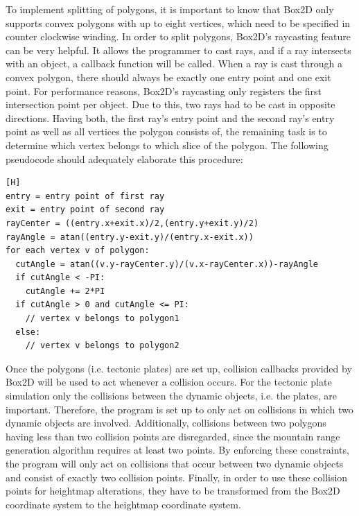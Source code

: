 \documentclass[11pt,a4paper,twoside,openright]{report}
\begin{document}
To implement splitting of polygons, it is important to know that Box2D only supports convex polygons with up to eight vertices, which need to be specified in counter clockwise winding. In order to split polygons, Box2D's raycasting feature can be very helpful. It allows the programmer to cast rays, and if a ray intersects with an object, a callback function will be called. When a ray is cast through a convex polygon, there should always be exactly one entry point and one exit point. For performance reasons, Box2D's raycasting only registers the first intersection point per object. Due to this, two rays had to be cast in opposite directions. Having both, the first ray's entry point and the second ray's entry point as well as all vertices the polygon consists of, the remaining task is to determine which vertex belongs to which slice of the polygon. The following pseudocode should adequately elaborate this procedure:

\begin{lstlisting}[caption=Point in slice check pseudocode][H]
entry = entry point of first ray
exit = entry point of second ray
rayCenter = ((entry.x+exit.x)/2,(entry.y+exit.y)/2)
rayAngle = atan((entry.y-exit.y)/(entry.x-exit.x))
for each vertex v of polygon:
  cutAngle = atan((v.y-rayCenter.y)/(v.x-rayCenter.x))-rayAngle
  if cutAngle < -PI:
    cutAngle += 2*PI
  if cutAngle > 0 and cutAngle <= PI:
    // vertex v belongs to polygon1
  else:
    // vertex v belongs to polygon2
\end{lstlisting}

\noindent Once the polygons (i.e. tectonic plates) are set up, collision callbacks provided by Box2D will be used to act whenever a collision occurs. For the tectonic plate simulation only the collisions between the dynamic objects, i.e. the plates, are important. Therefore, the program is set up to only act on collisions in which two dynamic objects are involved. Additionally, collisions between two polygons having less than two collision points are disregarded, since the mountain range generation algorithm requires at least two points. By enforcing these constraints, the program will only act on collisions that occur between two dynamic objects and consist of exactly two collision points. Finally, in order to use these collision points for heightmap alterations, they have to be transformed from the Box2D coordinate system to the heightmap coordinate system.
\end{document}
